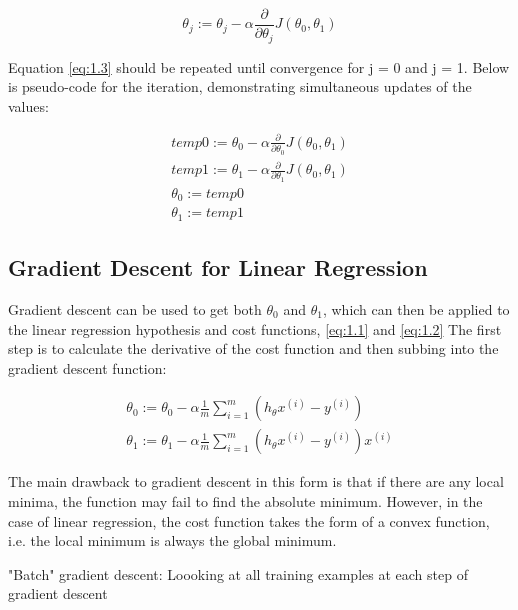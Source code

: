 \begin{equation}
	\theta_j := \theta_j - \alpha\frac{\partial}{\partial\theta_j}J(\theta_0, \theta_1)
	\label{eq:1.3}
\end{equation}

Equation \ref{eq:1.3} should be repeated until convergence for j = 0 and j = 1. Below is pseudo-code for the iteration, demonstrating simultaneous updates of the values:

\begin{equation}
	\begin{split}
	temp0 := \theta_0 - \alpha\frac{\partial}{\partial\theta_0}J(\theta_0, \theta_1)
	\\
	temp1 := \theta_1 - \alpha\frac{\partial}{\partial\theta_1}J(\theta_0, \theta_1)
	\\
	\theta_0 := temp0
	\\
	\theta_1 := temp1
	\end{split}
	\label{eq:1.4}
\end{equation}

\subsection{Gradient Descent for Linear Regression}

Gradient descent can be used to get both $\theta_0$ and $\theta_1$, which can then be applied to the linear regression hypothesis and cost functions, \ref{eq:1.1} and \ref{eq:1.2} The first step is to calculate the derivative of the cost function and then subbing into the gradient descent function: 

\begin{equation}
	\begin{split}
	\theta_0 := \theta_0 - \alpha\frac{1}{m}\sum_{i=1}^{m}(h_{\theta}x^{(i)} - y^{(i)})
	\\
	\theta_1 := \theta_1 - \alpha\frac{1}{m}\sum_{i=1}^{m}(h_{\theta}x^{(i)} - y^{(i)})x^{(i)}
	\end{split}
\end{equation}

The main drawback to gradient descent in this form is that if there are any local minima, the function may fail to find the absolute minimum. However, in the case of linear regression, the cost function takes the form of a convex function, i.e. the local minimum is always the global minimum. 

"Batch" gradient descent: Loooking at all training examples at each step of gradient descent
